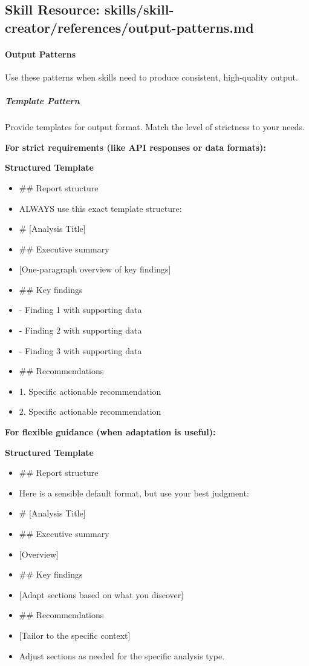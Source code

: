 \documentclass[11pt]{article}
\begin{document}
\subsection{Skill Resource: skills/skill-creator/references/output-patterns.md}\label{file:skills-skill-creator-references-output-patterns-md}

\paragraph{Output Patterns}\mbox{}\par

Use these patterns when skills need to produce consistent, high-quality output.


\subparagraph{Template Pattern}\mbox{}\par

Provide templates for output format. Match the level of strictness to your needs.


\textbf{For strict requirements (like API responses or data formats):}


\textbf{Structured Template}
\begin{itemize}[leftmargin=*,itemsep=2pt,topsep=2pt]
\item {} \#\# Report structure
\item {} ALWAYS use this exact template structure:
\item {} \# [Analysis Title]
\item {} \#\# Executive summary
\item {} [One-paragraph overview of key findings]
\item {} \#\# Key findings
\item {} - Finding 1 with supporting data
\item {} - Finding 2 with supporting data
\item {} - Finding 3 with supporting data
\item {} \#\# Recommendations
\item {} 1. Specific actionable recommendation
\item {} 2. Specific actionable recommendation
\end{itemize}

\textbf{For flexible guidance (when adaptation is useful):}


\textbf{Structured Template}
\begin{itemize}[leftmargin=*,itemsep=2pt,topsep=2pt]
\item {} \#\# Report structure
\item {} Here is a sensible default format, but use your best judgment:
\item {} \# [Analysis Title]
\item {} \#\# Executive summary
\item {} [Overview]
\item {} \#\# Key findings
\item {} [Adapt sections based on what you discover]
\item {} \#\# Recommendations
\item {} [Tailor to the specific context]
\item {} Adjust sections as needed for the specific analysis type.
\end{itemize}
\end{document}
